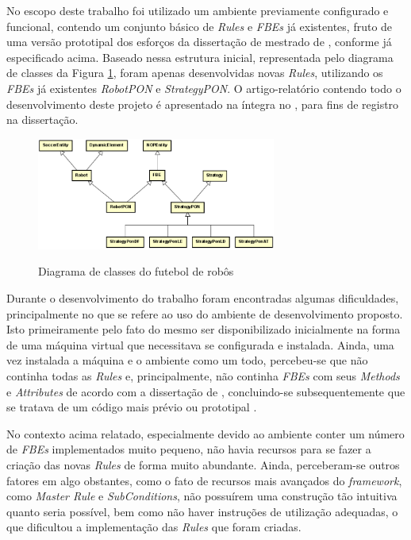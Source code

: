 No escopo deste trabalho foi utilizado um ambiente previamente configurado e
funcional, contendo um conjunto básico de \textit{Rules} e \textit{FBEs} já
existentes, fruto de uma versão prototipal dos esforços da dissertação de
mestrado de , conforme já especificado acima.
Baseado nessa estrutura inicial, representada pelo diagrama de classes da Figura
\ref{fig:class_futebol}, foram apenas desenvolvidas novas \textit{Rules},
utilizando os \textit{FBEs} já existentes \textit{RobotPON} e
\textit{StrategyPON}. O artigo-relatório contendo todo o desenvolvimento deste
projeto é apresentado na íntegra no , para fins de
registro na dissertação.

\begin{figure}[!htb]
    \centering
    \caption{Diagrama de classes do futebol de robôs}
    \includegraphics[width=0.7\textwidth]{../figures/class_futebol.png}
    \smallskip
    \label{fig:class_futebol}
\end{figure}

\FloatBarrier

Durante o desenvolvimento do trabalho foram encontradas algumas dificuldades,
principalmente no que se refere ao uso do ambiente de desenvolvimento proposto.
Isto primeiramente pelo fato do mesmo ser disponibilizado inicialmente na forma
de uma máquina virtual que necessitava se configurada e instalada. Ainda, uma vez
instalada a máquina e o ambiente como um todo, percebeu-se que não continha
todas as \textit{Rules} e, principalmente, não continha \textit{FBEs} com seus
\textit{Methods} e \textit{Attributes} de acordo com a dissertação de
, concluindo-se subsequentemente que se tratava de
um código mais prévio ou prototipal \cite{lima_2020}.

No contexto acima relatado, especialmente devido ao ambiente conter um número de
\textit{FBEs} implementados muito pequeno, não havia recursos para se fazer a
criação das novas \textit{Rules} de forma muito abundante. Ainda, perceberam-se
outros fatores em algo obstantes, como o fato de recursos mais avançados do
\textit{framework}, como \textit{Master Rule} e \textit{SubConditions}, não
possuírem uma construção tão intuitiva quanto seria possível, bem como não haver
instruções de utilização adequadas, o que dificultou a implementação das
\textit{Rules} que foram criadas.

